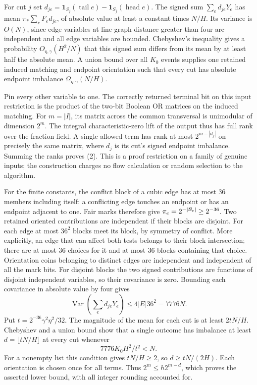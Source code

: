 \documentclass[
  11pt,
]{article}
\newcommand{\floor}[1]{\lfloor #1\rfloor}
\begin{document}
For cut \(j\) set
\(d_{je}=\mathbf1_{S_j}(\operatorname{tail}e)-\mathbf1_{S_j}(\operatorname{head}e)\).
The signed sum \(\sum_e d_{je}Y_e\) has mean
\(\pi_*\sum_e F_e d_{je}\), of absolute value at least a constant
times \(N/H\). Its variance is \(O(N)\), since edge variables at
line-graph distance greater than four are independent and all edge
variables are bounded. Chebyshev's inequality gives a probability
\(O_{\eta,\gamma}(H^2/N)\) that this signed sum differs from its mean by
at least half the absolute mean. A union bound over all \(K_0\) events
supplies one retained induced matching and endpoint orientation such
that every cut has absolute endpoint imbalance
\(\Omega_{\eta,\gamma}(N/H)\).

Pin every other variable to one. The correctly returned terminal bit on
this input restriction is the product of the two-bit Boolean OR matrices
on the induced matching. For \(m=|I|\), its matrix across the common
transversal is unimodular of dimension \(2^m\). The integral
characteristic-zero lift of the output thus has full rank over the
fraction field. A single allowed term has rank at most \(2^{m-|d_j|}\)
on precisely the same matrix, where \(d_j\) is its cut's signed endpoint
imbalance. Summing the ranks proves (2). This is a proof restriction on
a family of genuine inputs; the construction charges no flow calculation
or random selection to the algorithm.

For the finite constants, the conflict block of a cubic edge has at most
36 members including itself: a conflicting edge touches an endpoint or
has an endpoint adjacent to one. Fair marks therefore give
\(\pi_e=2^{-|{\cal B}_e|}\ge2^{-36}\). Two retained oriented contributions
are independent if their blocks are disjoint. For each edge at most \(36^2\)
blocks meet its block, by symmetry of conflict. More explicitly, an
edge that can affect both tests belongs to their block intersection;
there are at most 36 choices for it and at most 36 blocks containing
that choice. Orientation coins belonging to distinct edges are
independent and independent of all the mark bits. For disjoint blocks
the two signed contributions are functions of disjoint independent
variables, so their covariance is zero. Bounding each covariance in
absolute value by four gives
\[
 \operatorname{Var}\!\left(\sum_e d_{je}Y_e\right)
 \le4|E|36^2=7776N .
\]
Put \(t=2^{-36}\gamma^2\eta^2/32\). The magnitude of the mean for each
cut is at least \(2tN/H\). Chebyshev and a union bound show that a single
outcome has imbalance at least \(d=\floor{tN/H}\) at every cut whenever
\[
                    7776K_0 H^2/t^2<N.                 \tag{J}
\]
For a nonempty list this condition gives \(tN/H\ge2\), so
\(d\ge tN/(2H)\). Each orientation is chosen once for all terms.
Thus \(2^m\le h2^{m-d}\), which proves the asserted lower bound,
with all integer rounding accounted for.
\end{document}
